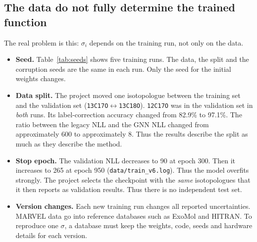 \documentclass[11pt,a4paper]{article}
\newcommand{\code}[1]{\texttt{#1}}
\begin{document}
\subsection{The data do not fully determine the trained function}
The real problem is this: $\sigma_i$ depends on the training run, not only on the data.
\begin{itemize}
\item \textbf{Seed.} Table~\ref{tab:seeds} shows five training runs. The data, the
  split and the corruption seeds are the same in each run. Only the seed for the
  initial weights changes.
\item \textbf{Data split.} The project moved one isotopologue between the training set
  and the validation set (\code{13C17O}$\leftrightarrow$\code{13C18O}).
  \code{12C17O} was in the validation set in \emph{both} runs. Its label-correction
  accuracy changed from 82.9\% to 97.1\%. The ratio between the legacy NLL and the GNN
  NLL changed from approximately 600 to approximately 8. Thus the results describe the
  split as much as they describe the method.
\item \textbf{Stop epoch.} The validation NLL decreases to 90 at epoch 300. Then it
  increases to 265 at epoch 950 (\code{data/train\_v6.log}). Thus the model overfits
  strongly. The project selects the checkpoint with the \emph{same} isotopologues that
  it then reports as validation results. Thus there is no independent test set.
\item \textbf{Version changes.} Each new training run changes all reported
  uncertainties. MARVEL data go into reference databases such as ExoMol and HITRAN. To
  reproduce one $\sigma$, a database must keep the weights, code, seeds and hardware
  details for each version.
\end{itemize}


\end{document}
